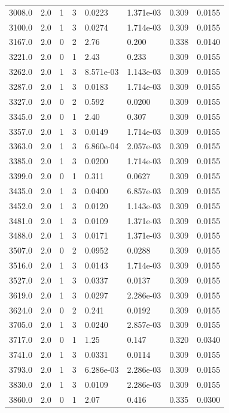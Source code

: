 \documentclass[preview]{standalone}
\begin{document}
{{{{\begin{tabular}{L{1.2cm}C{1.2cm} C{0.3cm}C{0.5cm} C{1.4cm}C{1.4cm} C{1.4cm}C{1.4cm}}
  3008.0  &   2.0  & 1     &  3 &  0.0223  & 1.371e-03  & 0.309 &  0.0155   \\ 
  3100.0  &   2.0  & 1     &  3 &  0.0274  & 1.714e-03  & 0.309 &  0.0155   \\ 
  3167.0  &   2.0  & 0     &  2 &  2.76  & 0.200  & 0.338 &  0.0140   \\ 
  3221.0  &   2.0  & 0     &  1 &  2.43  & 0.233  & 0.309 &  0.0155   \\ 
  3262.0  &   2.0  & 1     &  3 &  8.571e-03  & 1.143e-03  & 0.309 &  0.0155   \\ 
  3287.0  &   2.0  & 1     &  3 &  0.0183  & 1.714e-03  & 0.309 &  0.0155   \\ 
  3327.0  &   2.0  & 0     &  2 &  0.592  & 0.0200  & 0.309 &  0.0155   \\ 
  3345.0  &   2.0  & 0     &  1 &  2.40  & 0.307  & 0.309 &  0.0155   \\ 
  3357.0  &   2.0  & 1     &  3 &  0.0149  & 1.714e-03  & 0.309 &  0.0155   \\ 
  3363.0  &   2.0  & 1     &  3 &  6.860e-04  & 2.057e-03  & 0.309 &  0.0155   \\ 
  3385.0  &   2.0  & 1     &  3 &  0.0200  & 1.714e-03  & 0.309 &  0.0155   \\ 
  3399.0  &   2.0  & 0     &  1 &  0.311  & 0.0627  & 0.309 &  0.0155   \\ 
  3435.0  &   2.0  & 1     &  3 &  0.0400  & 6.857e-03  & 0.309 &  0.0155   \\ 
  3452.0  &   2.0  & 1     &  3 &  0.0120  & 1.143e-03  & 0.309 &  0.0155   \\ 
  3481.0  &   2.0  & 1     &  3 &  0.0109  & 1.371e-03  & 0.309 &  0.0155   \\ 
  3488.0  &   2.0  & 1     &  3 &  0.0171  & 1.371e-03  & 0.309 &  0.0155   \\ 
  3507.0  &   2.0  & 0     &  2 &  0.0952  & 0.0288  & 0.309 &  0.0155   \\ 
  3516.0  &   2.0  & 1     &  3 &  0.0143  & 1.714e-03  & 0.309 &  0.0155   \\ 
  3527.0  &   2.0  & 1     &  3 &  0.0337  & 0.0137  & 0.309 &  0.0155   \\ 
  3619.0  &   2.0  & 1     &  3 &  0.0297  & 2.286e-03  & 0.309 &  0.0155   \\ 
  3624.0  &   2.0  & 0     &  2 &  0.241  & 0.0192  & 0.309 &  0.0155   \\ 
  3705.0  &   2.0  & 1     &  3 &  0.0240  & 2.857e-03  & 0.309 &  0.0155   \\ 
  3717.0  &   2.0  & 0     &  1 &  1.25  & 0.147  & 0.320 &  0.0340   \\ 
  3741.0  &   2.0  & 1     &  3 &  0.0331  & 0.0114  & 0.309 &  0.0155   \\ 
  3793.0  &   2.0  & 1     &  3 &  6.286e-03  & 2.286e-03  & 0.309 &  0.0155   \\ 
  3830.0  &   2.0  & 1     &  3 &  0.0109  & 2.286e-03  & 0.309 &  0.0155   \\ 
  3860.0  &   2.0  & 0     &  1 &  2.07  & 0.416  & 0.335 &  0.0300   \\ 
\hline 
\end{tabular} 

}}}}
\end{document}
